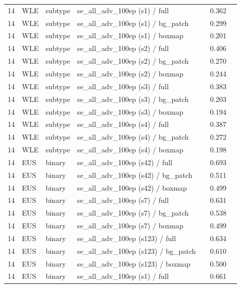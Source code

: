 \begin{longtable}{cL{1.1cm}L{1.5cm}L{5.6cm}ccc}
14 & WLE & subtype & se\_all\_adv\_100ep (s1) / full & \nl{} & 0.362 & \nl{} \\
14 & WLE & subtype & se\_all\_adv\_100ep (s1) / bg\_patch & \nl{} & 0.299 & \nl{} \\
14 & WLE & subtype & se\_all\_adv\_100ep (s1) / boxmap & \nl{} & 0.201 & \nl{} \\
14 & WLE & subtype & se\_all\_adv\_100ep (s2) / full & \nl{} & 0.406 & \nl{} \\
14 & WLE & subtype & se\_all\_adv\_100ep (s2) / bg\_patch & \nl{} & 0.270 & \nl{} \\
14 & WLE & subtype & se\_all\_adv\_100ep (s2) / boxmap & \nl{} & 0.244 & \nl{} \\
14 & WLE & subtype & se\_all\_adv\_100ep (s3) / full & \nl{} & 0.383 & \nl{} \\
14 & WLE & subtype & se\_all\_adv\_100ep (s3) / bg\_patch & \nl{} & 0.203 & \nl{} \\
14 & WLE & subtype & se\_all\_adv\_100ep (s3) / boxmap & \nl{} & 0.194 & \nl{} \\
14 & WLE & subtype & se\_all\_adv\_100ep (s4) / full & \nl{} & 0.387 & \nl{} \\
14 & WLE & subtype & se\_all\_adv\_100ep (s4) / bg\_patch & \nl{} & 0.272 & \nl{} \\
14 & WLE & subtype & se\_all\_adv\_100ep (s4) / boxmap & \nl{} & 0.198 & \nl{} \\
14 & EUS & binary & se\_all\_adv\_100ep (s42) / full & \nl{} & 0.693 & \nl{} \\
14 & EUS & binary & se\_all\_adv\_100ep (s42) / bg\_patch & \nl{} & 0.511 & \nl{} \\
14 & EUS & binary & se\_all\_adv\_100ep (s42) / boxmap & \nl{} & 0.499 & \nl{} \\
14 & EUS & binary & se\_all\_adv\_100ep (s7) / full & \nl{} & 0.631 & \nl{} \\
14 & EUS & binary & se\_all\_adv\_100ep (s7) / bg\_patch & \nl{} & 0.538 & \nl{} \\
14 & EUS & binary & se\_all\_adv\_100ep (s7) / boxmap & \nl{} & 0.499 & \nl{} \\
14 & EUS & binary & se\_all\_adv\_100ep (s123) / full & \nl{} & 0.634 & \nl{} \\
14 & EUS & binary & se\_all\_adv\_100ep (s123) / bg\_patch & \nl{} & 0.610 & \nl{} \\
14 & EUS & binary & se\_all\_adv\_100ep (s123) / boxmap & \nl{} & 0.500 & \nl{} \\
14 & EUS & binary & se\_all\_adv\_100ep (s1) / full & \nl{} & 0.661 & \nl{} \\

\end{longtable}
